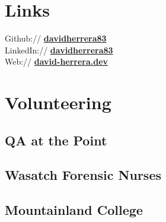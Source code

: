 \documentclass[hmargin=1.25cm, vmargin=0.75cm, scale=0.92]{deedy-resume-openfont}
\begin{document}
\begin{minipage}[t]{0.33\textwidth}
\section{Links}
Github:// \href{https://github.com/davidherrera83}{\bf davidherrera83} \\
LinkedIn:// \href{https://www.linkedin.com/in/davidherrera83}{\bf davidherrera83} \\
Web:// \href{https://www.david-herrera.dev}{\bf david-herrera.dev}
\sectionsep

\section{Volunteering}
\subsection{QA at the Point}
\hfill \break
\subsection{Wasatch Forensic Nurses}
\hfill \break
\subsection{Mountainland College}
\sectionsep

\end{minipage}
\hfill
\end{document}
